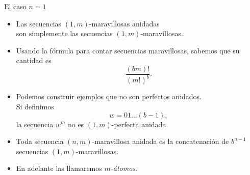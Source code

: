 \documentclass[spanish,xcolor={table}]{beamer}
\begin{document}
\begin{frame}{El caso $n = 1$}

\begin{itemize}
  \item Las secuencias $(1,m)$-maravillosas anidadas \\
  son simplemente las secuencias $(1,m)$-maravillosas.
  \pause
  \item Usando la fórmula para contar secuencias maravillosas, sabemos que
  su cantidad es
  \[ \frac{(bm)! }{(m!)^b}. \]
  \pause
  \item Podemos construir ejemplos que no son perfectos anidados. \\
  Si definimos
  \[ w = 01\dots(b-1), \]
  la secuencia $w^m$ no es $(1,m)$-perfecta anidada.
  \pause
  \item Toda secuencia $(n,m)$-maravillosa anidada es la concatenación de
  $b^{n-1}$ secuencias $(1,m)$-maravillosas.
  \item En adelante las llamaremos \emph{$m$-átomos}.
\end{itemize}

\end{frame}

\end{document}
